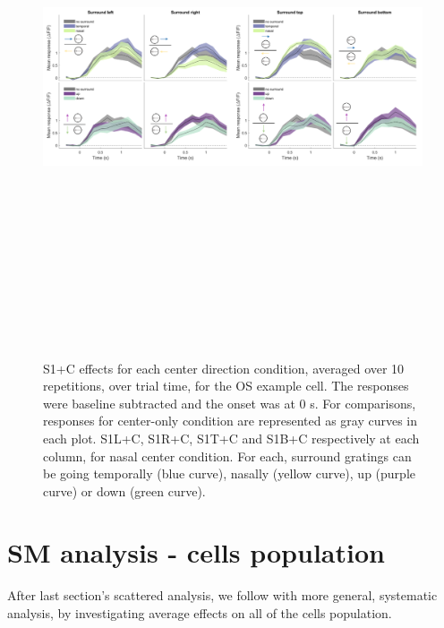 \begin{figure}[H] \centering \includegraphics[width=15.9cm,height=15.9cm,keepaspectratio]{Figures/7.Results/individualSM/roi_46_mf379_pos2/4.png} 
\caption{S1+C effects for each center direction condition, averaged over 10 repetitions, over trial time, for the OS example cell. The responses were baseline subtracted and the onset was at 0 s. For comparisons, responses for center-only condition are represented as gray curves in each plot.
S1L+C, S1R+C, S1T+C and S1B+C respectively at each column, for nasal center condition. For each, surround gratings can be going temporally (blue curve), nasally (yellow curve), up (purple curve) or down (green curve).}
\label{OSexamplecellSM}
\end{figure}

\section{SM analysis - cells population}

After last section's scattered analysis, we follow with more general, systematic analysis, by investigating average effects on all of the cells population.

